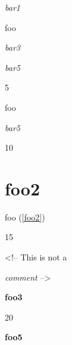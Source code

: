 
\def\mytitle{HTML Blocks}


\emph{bar1}

foo

\emph{bar3}


\emph{bar5}

5

foo

\emph{bar5}

10

\part{foo2}
\label{foo2}

foo (\autoref{foo2})

15

<!-- This is not a

\emph{comment} -->

\textbf{foo3}

20

\textbf{foo5}



